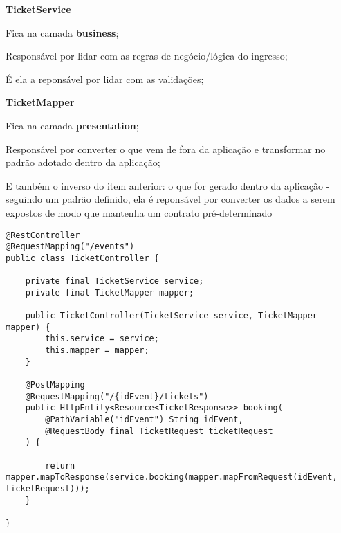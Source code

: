 \begin{alineas}

  \item \textbf{TicketService}

  \begin{alineas}
     \item Fica na camada \textbf{business};
     \item Responsável por lidar com as regras de negócio/lógica do ingresso;
     \item É ela a reponsável por lidar com as validações;
  \end{alineas}

  \item \textbf{TicketMapper}

  \begin{alineas}
     \item Fica na camada \textbf{presentation};
     \item Responsável por converter o que vem de fora da aplicação e transformar
           no padrão adotado dentro da aplicação;
     \item E também o inverso do item anterior: o que for gerado dentro da aplicação -
           seguindo um padrão definido, ela é reponsável por converter
           os dados a serem expostos de modo que mantenha um contrato pré-determinado
  \end{alineas}

\end{alineas}

\begin{lstlisting}[label=classe-ticket-controller,caption=Classe TicketController em Java]
@RestController
@RequestMapping("/events")
public class TicketController {

    private final TicketService service;
    private final TicketMapper mapper;

    public TicketController(TicketService service, TicketMapper mapper) {
        this.service = service;
        this.mapper = mapper;
    }

    @PostMapping
    @RequestMapping("/{idEvent}/tickets")
    public HttpEntity<Resource<TicketResponse>> booking(
        @PathVariable("idEvent") String idEvent,
        @RequestBody final TicketRequest ticketRequest
    ) {

        return mapper.mapToResponse(service.booking(mapper.mapFromRequest(idEvent, ticketRequest)));
    }

}
\end{lstlisting}

